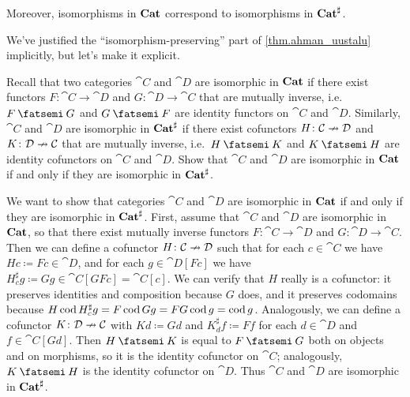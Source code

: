\documentclass[Book-Poly]{subfiles}
\begin{document}
Moreover, isomorphisms in $\mathbf{Cat}$ correspond to isomorphisms in $\mathbf{Cat}^\sharp$.

\begin{exercise}
We've justified the ``isomorphism-preserving'' part of \cref{thm.ahman_uustalu} implicitly, but let's make it explicit.

Recall that two categories $\cat{C}$ and $\cat{D}$ are isomorphic in $\mathbf{Cat}$ if there exist functors $F\colon\cat{C}\to\cat{D}$ and $G\colon\cat{D}\to\cat{C}$ that are mutually inverse, i.e.\ $F\then G$ and $G\then F$ are identity functors on $\cat{C}$ and $\cat{D}$.
Similarly, $\cat{C}$ and $\cat{D}$ are isomorphic in $\mathbf{Cat}^\sharp$ if there exist cofunctors $H\colon\mathcal{C}\nrightarrow\mathcal{D}$ and $K\colon\mathcal{D}\nrightarrow\mathcal{C}$ that are mutually inverse, i.e.\ $H\then K$ and $K\then H$ are identity cofunctors on $\cat{C}$ and $\cat{D}$.
Show that $\cat{C}$ and $\cat{D}$ are isomorphic in $\mathbf{Cat}$ if and only if they are isomorphic in $\mathbf{Cat}^\sharp$.
\begin{solution}
We want to show that categories $\cat{C}$ and $\cat{D}$ are isomorphic in $\mathbf{Cat}$ if and only if they are isomorphic in $\mathbf{Cat}^\sharp$.
First, assume that $\cat{C}$ and $\cat{D}$ are isomorphic in $\mathbf{Cat}$, so that there exist mutually inverse functors $F\colon\cat{C}\to\cat{D}$ and $G\colon\cat{D}\to\cat{C}$.
Then we can define a cofunctor $H\colon\mathcal{C}\nrightarrow\mathcal{D}$ such that for each $c\in\cat{C}$ we have $Hc\coloneqq Fc\in\cat{D}$, and for each $g\in\cat{D}[Fc]$ we have $H^\sharp_c g\coloneqq Gg\in\cat{C}[GFc]=\cat{C}[c]$.
We can verify that $H$ really is a cofunctor: it preserves identities and composition because $G$ does, and it preserves codomains because $H\operatorname{cod} H^\sharp_c g=F\operatorname{cod} Gg=FG\operatorname{cod} g=\operatorname{cod} g$.
Analogously, we can define a cofunctor $K\colon\mathcal{D}\nrightarrow\mathcal{C}$ with $Kd\coloneqq Gd$ and $K^\sharp_d f\coloneqq Ff$ for each $d\in\cat{D}$ and $f\in\cat{C}[Gd]$.
Then $H\then K$ is equal to $F\then G$ both on objects and on morphisms, so it is the identity cofunctor on $\cat{C}$; analogously, $K\then H$ is the identity cofunctor on $\cat{D}$.
Thus $\cat{C}$ and $\cat{D}$ are isomorphic in $\mathbf{Cat}^\sharp$.


\end{solution}
\end{exercise}
\end{document}
